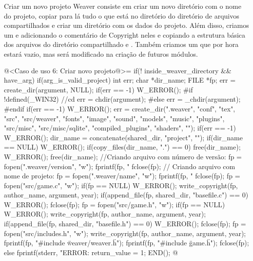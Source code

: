 {Criar um novo projeto Weaver consiste em criar um novo diretório com o
nome do projeto, copiar para lá tudo o que está no diretório
 do diretório de arquivos compartilhados e criar um
diretório  com os dados do projeto. Além disso,
criamos um  e  adicionando o
comentário de Copyright neles e copiando a estrutura básica dos
arquivos do diretório compartilhado  e
. Também criamos um
 que por hora estará vazio, mas será modificado
na criação de futuros módulos.

\iniciocodigo
@<Caso de uso 6: Criar novo projeto@>=
if(! inside_weaver_directory && have_arg){
  if(arg_is_valid_project){
    int err;
    char *dir_name;
    FILE *fp;
    err = create_dir(argument, NULL);
    if(err == -1) W_ERROR();
#if !defined(_WIN32) //cd
    err = chdir(argument);
#else
    err = _chdir(argument);
#endif
    if(err == -1) W_ERROR();
    err = create_dir(".weaver", "conf", "tex", "src", "src/weaver",
                     "fonts", "image", "sound", "models", "music",
                     "plugins", "src/misc", "src/misc/sqlite",
                     "compiled_plugins", "shaders", "");
    if(err == -1) W_ERROR();
    dir_name = concatenate(shared_dir, "project", "");
    if(dir_name == NULL) W_ERROR();
    if(copy_files(dir_name, ".") == 0){
      free(dir_name);
      W_ERROR();
    }
    free(dir_name); //Criando arquivo com número de versão:
    fp = fopen(".weaver/version", "w");
    fprintf(fp, "%
    fclose(fp); // Criando arquivo com nome de projeto:
    fp = fopen(".weaver/name", "w");
    fprintf(fp, "%
    fclose(fp);
    fp = fopen("src/game.c", "w");
    if(fp == NULL) W_ERROR();
    write_copyright(fp, author_name, argument, year);
    if(append_file(fp, shared_dir, "basefile.c") == 0) W_ERROR();
    fclose(fp);
    fp = fopen("src/game.h", "w");
    if(fp == NULL) W_ERROR();
    write_copyright(fp, author_name, argument, year);
    if(append_file(fp, shared_dir, "basefile.h") == 0) W_ERROR();
    fclose(fp);
    fp = fopen("src/includes.h", "w");
    write_copyright(fp, author_name, argument, year);
    fprintf(fp, "\n#include \"weaver/weaver.h\"\n");
    fprintf(fp, "\n#include \"game.h\"\n");
    fclose(fp);
  }
  else{
    fprintf(stderr, "ERROR: %
    return_value = 1;
  }
  END();
}
@
\fimcodigo


}
